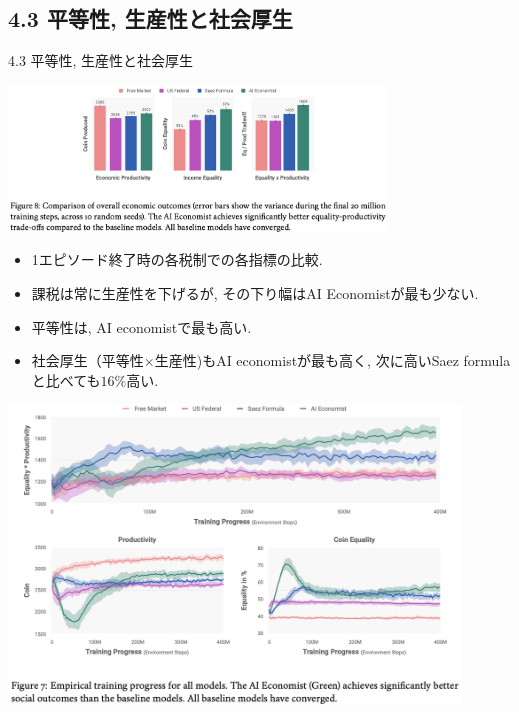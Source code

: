 \documentclass[unicode,aspectratio=169,11pt]{beamer}
\begin{document}
\subsection{4.3 平等性, 生産性と社会厚生}
\begin{frame}{4.3 平等性, 生産性と社会厚生}{}
    \begin{center}
        \includegraphics[width=10cm]{figure8.png}
    \end{center}
    \begin{itemize}
        \item 1エピソード終了時の各税制での各指標の比較.
        \item 課税は常に生産性を下げるが, その下り幅はAI Economistが最も少ない.
        \item 平等性は, AI economistで最も高い.
        \item 社会厚生（平等性$\times$生産性)もAI economistが最も高く, 次に高いSaez formulaと比べても$16\%$高い.
    \end{itemize}
\end{frame}

\begin{frame}{}{}
    \begin{center}
        \includegraphics[width=12cm]{figure7.png}
    \end{center}
\end{frame}
\end{document}
